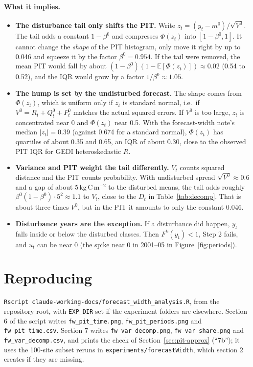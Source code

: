 \documentclass[11pt]{article}
\newcommand{\E}{\mathbb{E}}
\newcommand{\code}[1]{\texttt{#1}}
\begin{document}
\paragraph{What it implies.}
\begin{itemize}
  \item \textbf{The disturbance tail only shifts the PIT.} Write $z_t = (y_t - m^0)/\sqrt{V^0}$. The tail adds a constant
  $1 - \beta^0$ and compresses $\Phi(z_t)$ into $[1 - \beta^0, 1]$. It cannot change the
  \emph{shape} of the PIT histogram, only move it right by up to 0.046 and squeeze it by the factor
  $\beta^0 = 0.954$. If the tail were removed, the mean PIT would fall by about
  $(1 - \beta^0)(1 - \E[\Phi(z_t)]) \approx 0.02$ (0.54 to 0.52), and the IQR would grow by a
  factor $1/\beta^0 \approx 1.05$.
  \item \textbf{The hump is set by the undisturbed forecast.} The shape comes from $\Phi(z_t)$, which is uniform only if $z_t$ is standard normal,
  i.e.\ if $V^0 = R_t + Q^0_t + P^0_t$ matches the actual squared errors. If $V^0$ is too
  large, $z_t$ is concentrated near 0 and $\Phi(z_t)$ near 0.5. With the forecast-width note's
  median $|z_t| = 0.39$ (against 0.674 for a standard normal), $\Phi(z_t)$ has quartiles of about 0.35
  and 0.65, an IQR of about 0.30, close to the observed PIT IQR for GEDI
  heteroskedastic $R$.
  \item \textbf{Variance and PIT weight the tail differently.} $V_t$ counts squared distance and the PIT counts
  probability. With undisturbed spread $\sqrt{V^0} \approx 0.6$ and a gap of about
  5\,kg\,C\,m$^{-2}$ to the disturbed means, the tail adds roughly
  $\beta^0(1 - \beta^0)\cdot 5^2 \approx 1.1$ to $V_t$, close to the $D_t$ in
  Table~\ref{tab:decomp}. That is about three times $V^0$, but in the PIT it amounts to only the constant
  0.046.
  \item \textbf{Disturbance years are the exception.} If a disturbance did happen, $y_t$ falls inside or below the
  disturbed classes. Then $F^k(y_t) < 1$, Step 2 fails, and $u_t$ can be near 0 (the spike
  near 0 in 2001--05 in Figure~\ref{fig:periods}).
\end{itemize}

\section*{Reproducing}

\code{Rscript claude-working-docs/forecast\_width\_analysis.R}, from the repository root,
with \code{EXP\_DIR} set if the experiment folders are elsewhere. Section 6 of the script
writes \code{fw\_pit\_time.png}, \code{fw\_pit\_periods.png} and \code{fw\_pit\_time.csv}.
Section 7 writes \code{fw\_var\_decomp.png}, \code{fw\_var\_share.png} and
\code{fw\_var\_decomp.csv}, and prints the check of Section~\ref{sec:pit-approx} (``7b''); it uses the 100-site subset reruns in
\code{experiments/forecastWidth}, which section 2 creates if they are missing.
\end{document}
